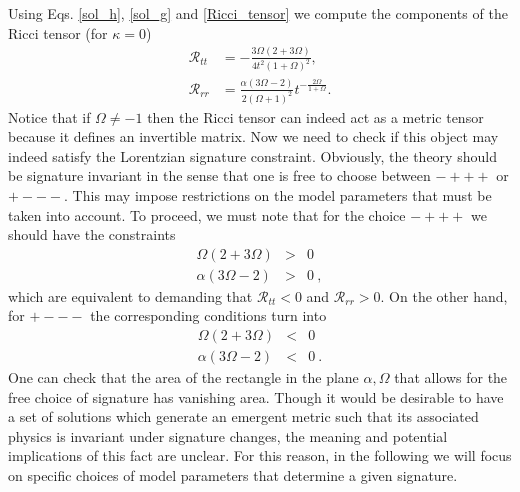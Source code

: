 \documentclass[epj]{svjour}
\begin{document}
Using Eqs. \eqref{sol_h}, \eqref{sol_g} and \eqref{Ricci_tensor} we compute the components 
of the Ricci tensor (for $\kappa=0$)
\begin{align}
    \mathcal{R}_{tt} & = -\frac{3\Omega\left(2 + 3 \Omega\right)}{4t^2 \left(1 + \Omega\right)^2}, \label{R_temporal} \\
    \mathcal{R}_{rr} & =\frac{\alpha\left(3\Omega - 2\right)}{2\left(\Omega + 1\right)^2}t^{-\frac{2\Omega}{1 + \Omega}} \label{R_spatial}.
\end{align}
Notice that if $\Omega \neq -1$ then the Ricci tensor can indeed act as a metric tensor because it defines an invertible matrix. Now we need to check if this object may indeed satisfy the Lorentzian signature constraint. Obviously, the theory should be signature invariant in the sense that one is free to choose between $-+++$ or $+---$. This may impose restrictions on the model parameters that must be taken into account. To proceed, we must note that for the choice $-+++$ we should have the constraints
\begin{eqnarray}
\Omega\left(2 + 3 \Omega\right)&>&0 \nonumber \\
\alpha\left(3\Omega - 2\right)&>&0 \nonumber  \ ,
\end{eqnarray}
which are equivalent to demanding that $\mathcal{R}_{tt}<0$ and $\mathcal{R}_{rr} >0$. On the other hand, for $+---$ the corresponding conditions turn into
\begin{eqnarray}
\Omega\left(2 + 3 \Omega\right)&<&0 \nonumber \\
\alpha\left(3\Omega - 2\right)&<&0 \nonumber  \ .
\end{eqnarray}
One can check that the area of the rectangle in the plane $\alpha, \Omega$ that allows for the free choice of signature has vanishing area. Though it would be desirable to have a set of solutions which generate an emergent metric such that its associated physics is invariant under signature changes, the meaning and potential implications of this fact are unclear. For this reason, in the following we will focus on specific choices of model parameters that determine a given signature. 
\end{document}

